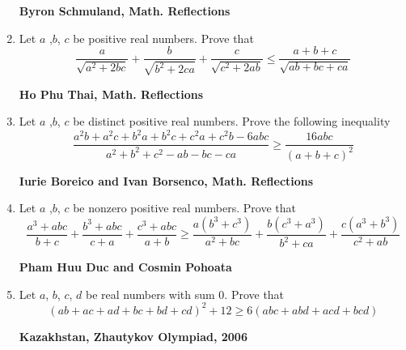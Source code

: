 \documentclass{article}
\begin{document}
\begin{enumerate}
\begin {flushright}
\textbf{Byron Schmuland, Math. Reflections}
\end{flushright}
\item Let $a$ ,$b$, $c$ be positive real numbers. Prove that $$\frac{a}{\sqrt{a^2+2bc}}+\frac{b}{\sqrt{b^2+2ca}}+\frac{c}{\sqrt{c^2+2ab}}\leq \frac{a+b+c}{\sqrt{ab+bc+ca}}$$
\begin {flushright}
\textbf{Ho Phu Thai, Math. Reflections}
\end{flushright}
\item Let $a$ ,$b$, $c$ be distinct positive real numbers. Prove the following inequality $$\frac{a^2b+a^2c+b^2a+b^2c+c^2a+c^2b-6abc}{a^2+b^2+c^2-ab-bc-ca}\geq \frac{16abc}{(a+b+c)^2}$$
\begin {flushright}
\textbf{Iurie Boreico and Ivan Borsenco, Math. Reflections}
\end{flushright}
\item Let $a$ ,$b$, $c$ be nonzero positive real numbers. Prove that $$\frac{a^3+abc}{b+c}+\frac{b^3+abc}{c+a}+\frac{c^3+abc}{a+b}\geq \frac{a(b^3+c^3)}{a^2+bc}+\frac{b(c^3+a^3)}{b^2+ca}+\frac{c(a^3+b^3)}{c^2+ab}$$
\begin {flushright}
\textbf{Pham Huu Duc and Cosmin Pohoata}
\end{flushright}
\item Let $a$, $b$, $c$, $d$ be real numbers with sum 0. Prove that $$(ab+ac+ad+bc+bd+cd)^2+12\geq 6(abc+abd+acd+bcd)$$
\begin {flushright}
\textbf{Kazakhstan, Zhautykov Olympiad, 2006}
\end{flushright}

\pagebreak


\end{enumerate}
\end{document}
